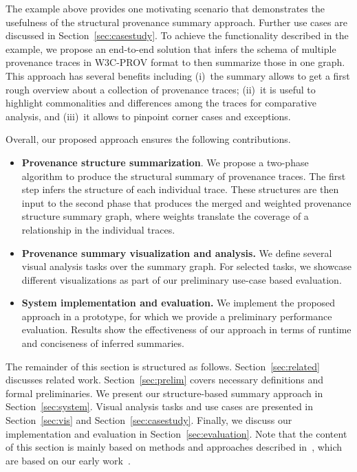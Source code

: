 The example above provides one motivating scenario that demonstrates the usefulness of the structural provenance summary approach.
Further use cases are discussed in Section~\ref{sec:casestudy}. To achieve the functionality described in the example, we propose an end-to-end solution that infers the schema of multiple provenance traces in W3C-PROV format  to then summarize those in one graph. 
This approach has several benefits including (i)~the summary allows to get a first rough overview about a collection of provenance traces; (ii)~it is useful to highlight commonalities and differences among the traces for comparative analysis, and (iii)~it allows to pinpoint corner cases and exceptions. 



Overall, our proposed approach ensures the following contributions.
\begin{itemize}
\item \textbf{Provenance structure summarization}. We propose a two-phase algorithm to produce the structural summary of provenance traces. The first step infers the structure of each individual trace. These structures are then input to the second phase that produces the merged and weighted provenance structure summary graph, where weights translate the coverage of a relationship in the individual traces. %
\item \textbf{Provenance summary visualization and analysis.} We define several visual analysis tasks over the summary graph. For selected tasks, we showcase different visualizations as part of our preliminary use-case based evaluation.%
\item \textbf{System implementation and evaluation.} We implement the proposed approach in a prototype, for which we provide a preliminary performance evaluation. Results show the effectiveness of our approach in terms of runtime and conciseness of inferred summaries. %
\end{itemize}

The remainder of this section is structured as follows. Section~\ref{sec:related} discusses related work. Section~\ref{sec:prelim} covers necessary definitions and formal preliminaries. We present our structure-based summary approach in Section~\ref{sec:system}. Visual analysis tasks and use cases are presented in Section~\ref{sec:vis} and Section~\ref{sec:casestudy}. Finally, we discuss our implementation and evaluation in Section~\ref{sec:evaluation}. 
Note that the content of this section is mainly based on methods and approaches described in~\cite{Houssem:19:TaPP}, which are based on our early work~\cite{baazizi2017}.